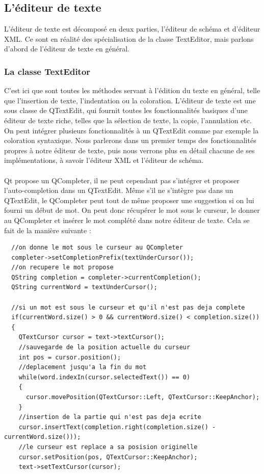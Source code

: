 \subsection{L'éditeur de texte}

L'éditeur de texte est décomposé en deux parties, l'éditeur de schéma et d'éditeur XML. Ce sont en réalité des spécialisation de la classe TextEditor, mais parlons d'abord de l'éditeur de texte en général.
\subsubsection{La classe TextEditor}
C'est ici que sont toutes les méthodes servant à l'édition du texte en général, telle que l'insertion de texte, l'indentation ou la coloration. L'éditeur de texte est une sous classe de QTextEdit, qui fournit toutes les fonctionnalités basiques d'une éditeur de texte riche, telles que la sélection de texte, la copie, l'annulation etc. On peut intégrer plusieurs fonctionnalités à un QTextEdit comme par exemple la coloration syntaxique. Nous parlerons dans un premier temps des fonctionnalités propres à notre éditeur de texte, puis nous verrons plus en détail chacune de ses implémentations, à savoir l'éditeur XML et l'éditeur de schéma.

\paragraph{}
Qt propose un QCompleter, il ne peut cependant pas s'intégrer et proposer l'auto-completion dans un QTextEdit. Même s'il ne s'intègre pas dans un QTextEdit, le QCompleter peut tout de même proposer une suggestion si on lui fourni un début de mot. On peut donc récupérer le mot sous le curseur, le donner au QCompleter et insérer le mot complété dans notre éditeur de texte. Cela se fait de la manière suivante :

\begin{lstlisting}
  //on donne le mot sous le curseur au QCompleter
  completer->setCompletionPrefix(textUnderCursor());
  //on recupere le mot propose
  QString completion = completer->currentCompletion();
  QString currentWord = textUnderCursor();

  //si un mot est sous le curseur et qu'il n'est pas deja complete
  if(currentWord.size() > 0 && currentWord.size() < completion.size())
  {
    QTextCursor cursor = text->textCursor();
    //sauvegarde de la position actuelle du curseur
    int pos = cursor.position();
    //deplacement jusqu'a la fin du mot
    while(word.indexIn(cursor.selectedText()) == 0)
    {
      cursor.movePosition(QTextCursor::Left, QTextCursor::KeepAnchor);
    }
    //insertion de la partie qui n'est pas deja ecrite
    cursor.insertText(completion.right(completion.size() - currentWord.size()));
    //le curseur est replace a sa posision originelle
    cursor.setPosition(pos, QTextCursor::KeepAnchor);
    text->setTextCursor(cursor);
\end{lstlisting}
